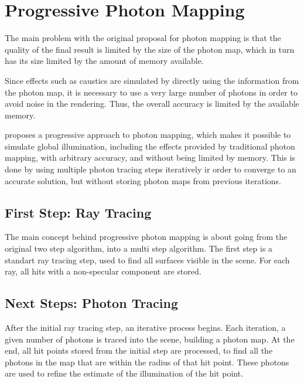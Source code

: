 \documentclass[main.tex]{subfiles}
\begin{document}
\section{Progressive Photon Mapping} \label{section:ppm_initial}

The main problem with the original proposal for photon mapping is that the quality of the final result is limited by the size of the photon map, which in turn has its size limited by the amount of memory available.

Since effects such as caustics are simulated by directly using the information from the photon map, it is necessary to use a very large number of photons in order to avoid noise in the rendering. Thus, the overall accuracy is limited by the available memory.

\cite{hachisuka2008progressive} proposes a progressive approach to photon mapping, which makes it possible to simulate global illumination, including the effects provided by traditional photon mapping, with arbitrary accuracy, and without being limited by memory. This is done by using multiple photon tracing steps iteratively ir order to converge to an accurate solution, but without storing photon maps from previous iterations.

\subsection{First Step: Ray Tracing}

The main concept behind progressive photon mapping is about going from the original two step algorithm, into a multi step algorithm. The first step is a standart ray tracing step, used to find all surfaces visible in the scene. For each ray, all hits with a non-specular component are stored.


\subsection{Next Steps: Photon Tracing}

After the initial ray tracing step, an iterative process begins. Each iteration, a given number of photons is traced into the scene, building a photon map. At the end, all hit points stored from the initial step are processed, to find all the photons in the map that are within the radius of that hit point. These photons are used to refine the estimate of the illumination of the hit point.
\end{document}
